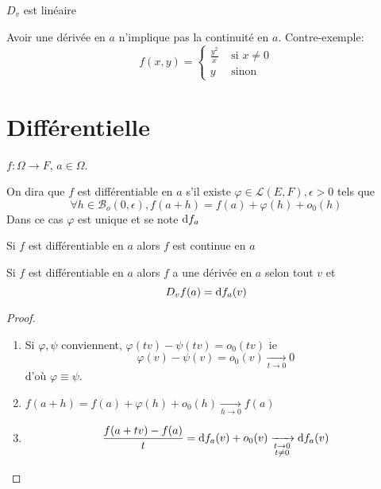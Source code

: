 \begin{rem}
    $D_v$ est linéaire
\end{rem}

\begin{rem}
    Avoir une dérivée en $a$ n'implique pas la continuité en $a$. Contre-exemple: \[
        f(x, y)=\begin{cases}
            \frac{y^2}x &\text{ si }x\neq 0\\ y & \text{ sinon}
        \end{cases}
    \]
\end{rem}

\section{Différentielle}

\begin{defprop}
    \Hyp $f:\Omega\longrightarrow F$, $a\in \Omega$. \begin{concenum}
    \item On dira que $f$ est différentiable en $a$ s'il existe $\varphi\in\mathcal L(E, F), \epsilon>0$ tels que \[
            \forall h\in\mathcal B_o(0, \epsilon), f(a+h)=f(a)+\varphi(h)+o_0(h)
        \]
        Dans ce cas $\varphi$ est unique et se note $\mathrm{d} f_a$
    \item Si $f$ est différentiable en $a$ alors $f$ est continue en $a$
    \item Si $f$ est différentiable en $a$ alors $f$ a une dérivée en $a$ selon tout $v$ et \[
            D_vf(a)=\mathrm{d} f_a(v)
        \]
    \end{concenum}
\end{defprop}

\begin{proof} ~
    \begin{enumerate}
        \item Si $\varphi, \psi$ conviennent, $\varphi(tv)-\psi(tv)=o_0(tv)$ ie \[
                \varphi(v)-\psi(v)=o_0(v)\xrightarrow[t\to 0]{}0
            \]
            d'où $\varphi\equiv \psi$.
        \item $f(a+h)=f(a)+\varphi(h)+o_0(h)\xrightarrow[h\to 0]{}f(a)$
        \item \[
                \frac{f(a+tv)-f(a)}{t}=\mathrm{d} f_a(v)+o_0(v)\xrightarrow[\substack{t\to 0\\t\neq 0}]{}\mathrm{d} f_a(v)
            \]
    \end{enumerate}
\end{proof}

